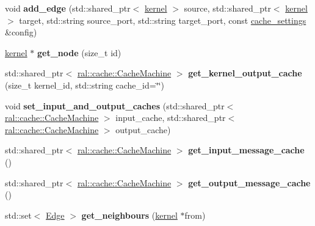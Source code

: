 \begin{DoxyCompactItemize}
void {\bfseries add\+\_\+edge} (std\+::shared\+\_\+ptr$<$ \hyperlink{classral_1_1cache_1_1kernel}{kernel} $>$ source, std\+::shared\+\_\+ptr$<$ \hyperlink{classral_1_1cache_1_1kernel}{kernel} $>$ target, std\+::string source\+\_\+port, std\+::string target\+\_\+port, const \hyperlink{structral_1_1cache_1_1cache__settings}{cache\+\_\+settings} \&config)
\item 
\mbox{\label{classral_1_1cache_1_1graph_aa8e30e721fd0bda87b95303ad4ee4f47}} 
\hyperlink{classral_1_1cache_1_1kernel}{kernel} $\ast$ {\bfseries get\+\_\+node} (size\+\_\+t id)
\item 
\mbox{\label{classral_1_1cache_1_1graph_a2526f97e8c3eb0e0d58e98c47490dd92}} 
std\+::shared\+\_\+ptr$<$ \hyperlink{classral_1_1cache_1_1CacheMachine}{ral\+::cache\+::\+Cache\+Machine} $>$ {\bfseries get\+\_\+kernel\+\_\+output\+\_\+cache} (size\+\_\+t kernel\+\_\+id, std\+::string cache\+\_\+id=\char`\"{}\char`\"{})
\item 
\mbox{\label{classral_1_1cache_1_1graph_a6f9aa9b9a091151f76f22f55765e4615}} 
void {\bfseries set\+\_\+input\+\_\+and\+\_\+output\+\_\+caches} (std\+::shared\+\_\+ptr$<$ \hyperlink{classral_1_1cache_1_1CacheMachine}{ral\+::cache\+::\+Cache\+Machine} $>$ input\+\_\+cache, std\+::shared\+\_\+ptr$<$ \hyperlink{classral_1_1cache_1_1CacheMachine}{ral\+::cache\+::\+Cache\+Machine} $>$ output\+\_\+cache)
\item 
\mbox{\label{classral_1_1cache_1_1graph_afb9d57ee7844be046911f265337ad974}} 
std\+::shared\+\_\+ptr$<$ \hyperlink{classral_1_1cache_1_1CacheMachine}{ral\+::cache\+::\+Cache\+Machine} $>$ {\bfseries get\+\_\+input\+\_\+message\+\_\+cache} ()
\item 
\mbox{\label{classral_1_1cache_1_1graph_ad694f6bf51aad0b9d8fae90a80dbaf06}} 
std\+::shared\+\_\+ptr$<$ \hyperlink{classral_1_1cache_1_1CacheMachine}{ral\+::cache\+::\+Cache\+Machine} $>$ {\bfseries get\+\_\+output\+\_\+message\+\_\+cache} ()
\item 
\mbox{\label{classral_1_1cache_1_1graph_a94c6704384bfadf33a0585de2615b843}} 
std\+::set$<$ \hyperlink{structral_1_1cache_1_1graph_1_1Edge}{Edge} $>$ {\bfseries get\+\_\+neighbours} (\hyperlink{classral_1_1cache_1_1kernel}{kernel} $\ast$from)

\end{DoxyCompactItemize}
